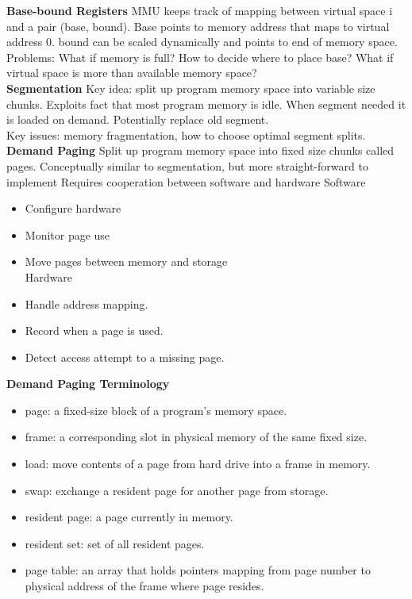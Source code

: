 \documentclass[letterpaper, 8pt]{extarticle}
\begin{document}
\begin{multicols*}{6}
	\textbf{Base-bound Registers}
	MMU keeps track of mapping between virtual space i and a pair (base, bound). Base points to memory address that maps to virtual address 0. bound can be scaled dynamically and points to end of memory space.\\
	Problems: What if memory is full? How to decide where to place base? What if virtual space is more than available memory space?\\
	\textbf{Segmentation} Key idea: split up program memory space into variable size chunks. Exploits fact that most program memory is idle. When segment needed it is loaded on demand. Potentially replace old segment.\\
Key issues: memory fragmentation, how to choose optimal segment splits.\\
	\textbf{Demand Paging} Split up program memory space into fixed size chunks called pages.
Conceptually similar to segmentation, but more straight-forward to implement
Requires cooperation between software and hardware
	Software\\
	\begin{itemize}
	\item Configure hardware
	\item Monitor page use
	\item Move pages between memory and storage\\
	Hardware
	\item Handle address mapping.
	\item Record when a page is used.
	\item Detect access attempt to a missing page.
	\end{itemize}
	\textbf{Demand Paging Terminology}\\
	\begin{itemize}
	\item page: a fixed-size block of a program’s memory space.
	\item frame: a corresponding slot in physical memory of the same fixed size.
	\item load: move contents of a page from hard drive into a frame in memory.
	\item swap: exchange a resident page for another page from storage.
	\item resident page: a page currently in memory.
	\item resident set: set of all resident pages.
	\item page table: an array that holds pointers mapping from page number to physical address of the frame where page resides.

\end{itemize}
\end{multicols*}
\end{document}
